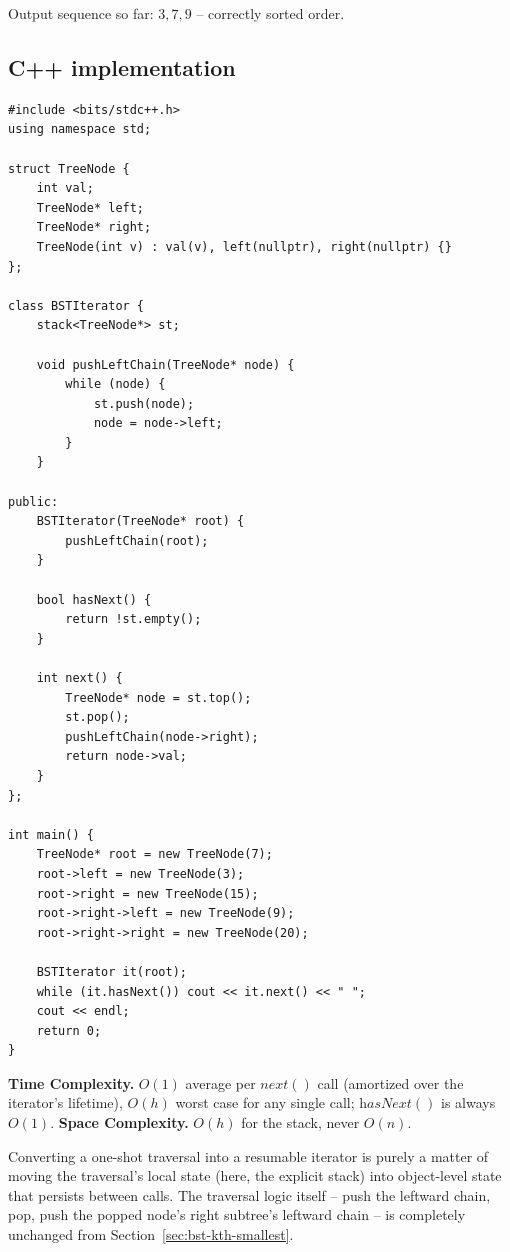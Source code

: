 Output sequence so far: $3,7,9$ -- correctly sorted order.

\subsection*{C++ implementation}

\begin{lstlisting}
#include <bits/stdc++.h>
using namespace std;

struct TreeNode {
    int val;
    TreeNode* left;
    TreeNode* right;
    TreeNode(int v) : val(v), left(nullptr), right(nullptr) {}
};

class BSTIterator {
    stack<TreeNode*> st;

    void pushLeftChain(TreeNode* node) {
        while (node) {
            st.push(node);
            node = node->left;
        }
    }

public:
    BSTIterator(TreeNode* root) {
        pushLeftChain(root);
    }

    bool hasNext() {
        return !st.empty();
    }

    int next() {
        TreeNode* node = st.top();
        st.pop();
        pushLeftChain(node->right);
        return node->val;
    }
};

int main() {
    TreeNode* root = new TreeNode(7);
    root->left = new TreeNode(3);
    root->right = new TreeNode(15);
    root->right->left = new TreeNode(9);
    root->right->right = new TreeNode(20);

    BSTIterator it(root);
    while (it.hasNext()) cout << it.next() << " ";
    cout << endl;
    return 0;
}
\end{lstlisting}

\begin{complexitybox}
\textbf{Time Complexity.} $O(1)$ average per $\textit{next}()$ call
(amortized over the iterator's lifetime), $O(h)$ worst case for any
single call; $\textit{hasNext}()$ is always $O(1)$.
\textbf{Space Complexity.} $O(h)$ for the stack, never $O(n)$.
\end{complexitybox}

\begin{takeawaybox}
Converting a one-shot traversal into a resumable iterator is purely a
matter of moving the traversal's local state (here, the explicit stack)
into object-level state that persists between calls. The traversal logic
itself -- push the leftward chain, pop, push the popped node's right
subtree's leftward chain -- is completely unchanged from
Section~\ref{sec:bst-kth-smallest}.
\end{takeawaybox}
